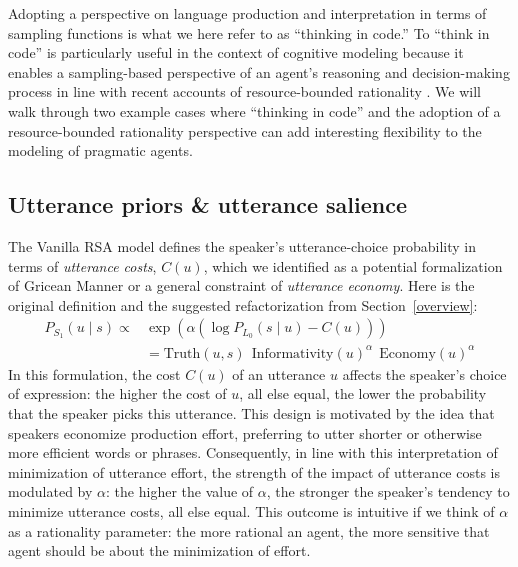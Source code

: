 \documentclass{sp}
\begin{document}
Adopting a perspective on language production and interpretation in terms of sampling functions is what we here refer to as ``thinking in code.''
To ``think in code'' is particularly useful in the context of cognitive modeling because it enables a sampling-based perspective of an agent's reasoning and decision-making process in line with recent accounts of resource-bounded rationality \citep{GriffithsLieder2015:Rational-Use-of, lieder2020resource}.
We will walk through two example cases where ``thinking in code'' and the adoption of a resource-bounded rationality perspective can add interesting flexibility to the modeling of pragmatic agents.

\subsection{Utterance priors \& utterance salience}

The Vanilla RSA model defines the speaker's utterance-choice probability in terms of \emph{utterance costs}, $C(u)$, which we identified as a potential formalization of Gricean Manner or a general constraint of \emph{utterance economy}.
Here is the original definition and the suggested refactorization from Section~\ref{overview}:
\begin{align} \label{S1-repeat-again}
  P_{S_1}(u\mid s) \propto & \exp (\alpha (\log P_{L_0}(s \mid u) - C(u)))  \\
       & = \text{Truth}(u,s) \ \ \text{Informativity}(u)^{\alpha} \ \ \text{Economy}(u)^{\alpha} \nonumber
\end{align}
In this formulation, the cost $C(u)$ of an utterance $u$ affects the speaker's choice of expression: the higher the cost of $u$, all else equal, the lower the probability that the speaker picks this utterance.
This design is motivated by the idea that speakers economize production effort, preferring to utter shorter or otherwise more efficient words or phrases.
Consequently, in line with this interpretation of minimization of utterance effort, the strength of the impact of utterance costs is modulated by $\alpha$: the higher the value of $\alpha$, the stronger the speaker's tendency to minimize utterance costs, all else equal.
This outcome is intuitive if we think of $\alpha$ as a rationality parameter:
the more rational an agent, the more sensitive that agent should be about the minimization of effort.
\end{document}
